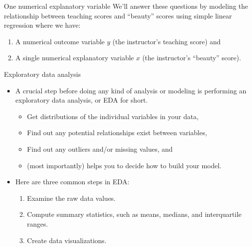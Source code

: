 \documentclass[
  ignorenonframetext,
]{beamer}
\providecommand{\tightlist}{%
  \setlength{\itemsep}{0pt}\setlength{\parskip}{0pt}}
\begin{document}
\begin{frame}{One numerical explanatory variable}
\protect{}\label{one-numerical-explanatory-variable-2}
We'll answer these questions by modeling the relationship between
teaching scores and ``beauty'' scores using simple linear regression
where we have:

\begin{enumerate}
\item
  A numerical outcome variable \(y\) (the instructor's teaching score)
  and
\item
  A single numerical explanatory variable \(x\) (the instructor's
  ``beauty'' score).
\end{enumerate}
\end{frame}

\begin{frame}{Exploratory data analysis}
\protect{}\label{exploratory-data-analysis}
\begin{itemize}
\item
  A crucial step before doing any kind of analysis or modeling is
  performing an exploratory data analysis, or EDA for short.

  \begin{itemize}
  \tightlist
  \item
    Get distributions of the individual variables in your data,
  \item
    Find out any potential relationships exist between variables,
  \item
    Find out any outliers and/or missing values, and
  \item
    (most importantly) helps you to decide how to build your model.
  \end{itemize}
\item
  Here are three common steps in EDA:

  \begin{enumerate}
  \tightlist
  \item
    Examine the raw data values.
  \item
    Compute summary statistics, such as means, medians, and
    interquartile ranges.
  \item
    Create data visualizations.
  \end{enumerate}
\end{itemize}
\end{frame}
\end{document}
